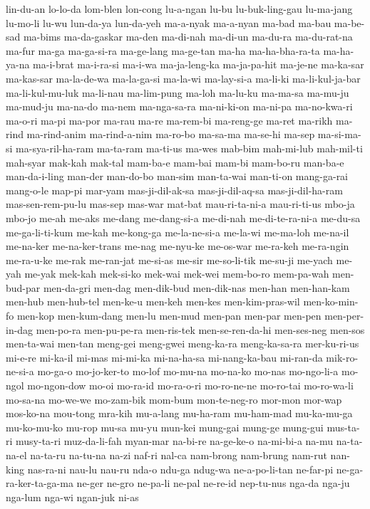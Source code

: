 {lin-du-an lo-lo-da lom-blen lon-cong lu-a-ngan lu-bu lu-buk-ling-gau
lu-ma-jang lu-mo-li lu-wu lun-da-ya lun-da-yeh ma-a-nyak ma-a-nyan ma-bad
ma-bau ma-be-sad ma-bims ma-da-gaskar ma-den ma-di-nah ma-di-un ma-du-ra
ma-du-rat-na ma-fur ma-ga ma-ga-si-ra ma-ge-lang ma-ge-tan ma-ha
ma-ha-bha-ra-ta ma-ha-ya-na ma-i-brat ma-i-ra-si ma-i-wa ma-ja-leng-ka
ma-ja-pa-hit ma-je-ne ma-ka-sar ma-kas-sar ma-la-de-wa ma-la-ga-si
ma-la-wi ma-lay-si-a ma-li-ki ma-li-kul-ja-bar ma-li-kul-mu-luk ma-li-nau
ma-lim-pung ma-loh ma-lu-ku ma-ma-sa ma-mu-ju ma-mud-ju ma-na-do ma-nem
ma-nga-sa-ra ma-ni-ki-on ma-ni-pa ma-no-kwa-ri ma-o-ri ma-pi ma-por ma-rau
ma-re ma-rem-bi ma-reng-ge ma-ret ma-rikh ma-rind ma-rind-anim
ma-rind-a-nim ma-ro-bo ma-sa-ma ma-se-hi ma-sep ma-si-ma-si
ma-sya-ril-ha-ram ma-ta-ram ma-ti-us ma-wes mab-bim mah-mi-lub mah-mil-ti
mah-syar mak-kah mak-tal mam-ba-e mam-bai mam-bi mam-bo-ru man-ba-e
man-da-i-ling man-der man-do-bo man-sim man-ta-wai man-ti-on mang-ga-rai
mang-o-le map-pi mar-yam mas-ji-dil-ak-sa mas-ji-dil-aq-sa
mas-ji-dil-ha-ram mas-sen-rem-pu-lu mas-sep mas-war mat-bat mau-ri-ta-ni-a
mau-ri-ti-us mbo-ja mbo-jo me-ah me-aks me-dang me-dang-si-a me-di-nah
me-di-te-ra-ni-a me-du-sa me-ga-li-ti-kum me-kah me-kong-ga me-la-ne-si-a
me-la-wi me-ma-loh me-na-il me-na-ker me-na-ker-trans me-nag me-nyu-ke
me-os-war me-ra-keh me-ra-ngin me-ra-u-ke me-rak me-ran-jat me-si-as
me-sir me-so-li-tik me-su-ji me-yach me-yah me-yak mek-kah mek-si-ko
mek-wai mek-wei mem-bo-ro mem-pa-wah men-bud-par men-da-gri men-dag
men-dik-bud men-dik-nas men-han men-han-kam men-hub men-hub-tel men-ke-u
men-keh men-kes men-kim-pras-wil men-ko-min-fo men-kop men-kum-dang men-lu
men-mud men-pan men-par men-pen men-per-in-dag men-po-ra men-pu-pe-ra
men-ris-tek men-se-ren-da-hi men-ses-neg men-sos men-ta-wai men-tan
meng-gei meng-gwei meng-ka-ra meng-ka-sa-ra mer-ku-ri-us mi-e-re mi-ka-il
mi-mas mi-mi-ka mi-na-ha-sa mi-nang-ka-bau mi-ran-da mik-ro-ne-si-a
mo-ga-o mo-jo-ker-to mo-lof mo-mu-na mo-na-ko mo-nas mo-ngo-li-a mo-ngol
mo-ngon-dow mo-oi mo-ra-id mo-ra-o-ri mo-ro-ne-ne mo-ro-tai mo-ro-wa-li
mo-sa-na mo-we-we mo-zam-bik mom-bum mon-te-neg-ro mor-mon mor-wap
mos-ko-na mou-tong mra-kih mu-a-lang mu-ha-ram mu-ham-mad mu-ka-mu-ga
mu-ko-mu-ko mu-rop mu-sa mu-yu mun-kei mung-gai mung-ge mung-gui mus-ta-ri
musy-ta-ri muz-da-li-fah myan-mar na-bi-re na-ge-ke-o na-mi-bi-a na-mu
na-ta-na-el na-ta-ru na-tu-na na-zi naf-ri nal-ca nam-brong nam-brung
nam-rut nan-king nas-ra-ni nau-lu nau-ru nda-o ndu-ga ndug-wa
ne-a-po-li-tan ne-far-pi ne-ga-ra-ker-ta-ga-ma ne-ger ne-gro ne-pa-li
ne-pal ne-re-id nep-tu-nus nga-da nga-ju nga-lum nga-wi ngan-juk ni-as
}
